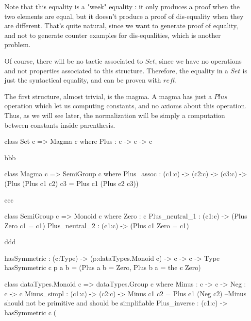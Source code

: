 \documentclass{sigplanconf}
\begin{document}
Note that this equality is a "week" equality : it only produces a proof when the two elements are equal, but it doesn't produce a proof of dis-equality when they are different. That's quite natural, since we want to generate proof of equality, and not to generate counter examples for dis-equalities, which is another problem.

Of course, there will be no tactic associated to $Set$, since we have no operations and not properties associated to this structure. Therefore, the equality in a $Set$ is just the syntactical equality, and can be proven with $refl$.

The first structure, almost trivial, is the magma. A magma has just a $Plus$ operation which let us computing constants, and no axioms about this operation. Thus, as we will see later, the normalization will be simply a computation between constants inside parenthesis.

\begin{code}[caption=Magma, captionpos=b, label=lst1:haskell2]   
class Set c => Magma c where
    Plus : c -> c -> c
\end{code}

bbb

\begin{code}[caption=Semi-Group, captionpos=b, label=lst1:haskell2]   
class Magma c => SemiGroup c where
    Plus_assoc : (c1:c) -> (c2:c) -> (c3:c) -> (Plus (Plus c1 c2) c3 = Plus c1 (Plus c2 c3))
\end{code}

ccc

\begin{code}[caption=Monoid, captionpos=b, label=lst1:haskell2]   
class SemiGroup c => Monoid c where
	Zero : c    
    Plus_neutral_1 : (c1:c) -> (Plus Zero c1 = c1)    
    Plus_neutral_2 : (c1:c) -> (Plus c1 Zero = c1)
\end{code}	

ddd

\begin{code}[caption=Group, captionpos=b, label=lst1:haskell2]   
hasSymmetric : (c:Type) -> (p:dataTypes.Monoid c) -> c -> c -> Type
hasSymmetric c p a b = (Plus a b = Zero, Plus b a = the c Zero)    
  
class dataTypes.Monoid c => dataTypes.Group c where
	Minus : c -> c ->
	Neg : c -> c
    Minus_simpl : (c1:c) -> (c2:c) -> Minus c1 c2 = Plus c1 (Neg c2) --Minus should not be primitive and should be simplifiable
    Plus_inverse : (c1:c) -> hasSymmetric c (%
\end{code}	
\end{document}
